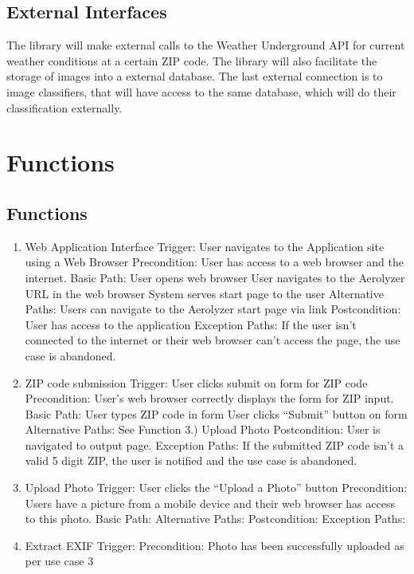 \documentclass[journal,10pt,draftclsnofoot,onecolumn]{IEEEtran}
\begin{document}
\begin{singlespace}
\subsection{External Interfaces}
The library will make external calls to the Weather Underground API for current weather conditions at a certain ZIP code.
The library will also facilitate the storage of images into a external database.
The last external connection is to image classifiers, that will have access to the same database, which will do their classification externally.

\section{Functions}
\subsection{Functions}
\begin{enumerate}
\item Web Application Interface
Trigger: User navigates to the Application site using a Web Browser
Precondition: User has access to a web browser and the internet.
Basic Path:
User opens web browser
User navigates to the Aerolyzer URL in the web browser
System serves start page to the user
Alternative Paths: Users can navigate to the Aerolyzer start page via link
Postcondition: User has access to the application
Exception Paths: If the user isn't connected to the internet or their web browser can't access the page, the use case is abandoned.
\\
\item ZIP code submission
Trigger: User clicks submit on form for ZIP code
Precondition: User's web browser correctly displays the form for ZIP input.
Basic Path:
User types ZIP code in form
User clicks “Submit” button on form
Alternative Paths: See Function 3.) Upload Photo
Postcondition: User is navigated to output page.
Exception Paths: If the submitted ZIP code isn't a valid 5 digit ZIP, the user is notified and the use case is abandoned.
\\
\item Upload Photo
Trigger: User clicks the “Upload a Photo” button
Precondition: Users have a picture from a mobile device and their web browser has access to this photo.
Basic Path:
Alternative Paths:
Postcondition:
Exception Paths: 
\\
\item Extract EXIF
Trigger:
Precondition: Photo has been successfully uploaded as per use case 3

\end{enumerate}
\end{singlespace}
\end{document}
